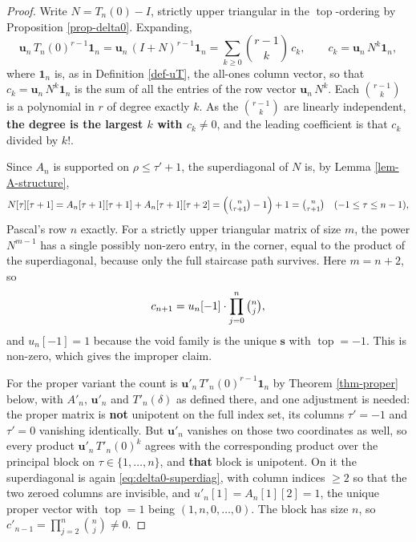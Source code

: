 \documentclass[11pt, a4paper, abstract=yes]{scrartcl}
\theoremstyle{definition}
\theoremstyle{remark}
\theoremstyle{plain}
\newcommand{\vek}[1]{\boldsymbol{#1}}
\newcommand{\tp}{\operatorname{top}}
\begin{document}
\begin{proof}
Write \(N=T_n(0)-I\), strictly upper triangular in the \(\tp\)-ordering by Proposition
\ref{prop-delta0}. Expanding,
\begin{equation}\label{eq:delta0-expansion}
  \vek u_n\,T_n(0)^{r-1}\vek 1_n=\vek u_n\,(I+N)^{r-1}\vek 1_n
  =\sum_{k\ge0}\binom{r-1}{k}\,c_k,\qquad c_k=\vek u_n\,N^k\vek 1_n ,
\end{equation}
where \(\vek 1_n\) is, as in Definition \ref{def-uT}, the all-ones column vector, so that
\(c_k=\vek u_n\,N^k\vek 1_n\) is the sum of all the entries of the row vector \(\vek u_n\,N^k\). Each
\(\binom{r-1}{k}\) is a polynomial in \(r\) of degree exactly \(k\). As the \(\binom{r-1}{k}\)
are linearly independent, \textbf{the degree is the largest \(k\) with \(c_k\ne0\)}, and the leading
coefficient is that \(c_k\) divided by \(k!\).

Since \(A_n\) is supported on \(\rho\le\tau'+1\), the superdiagonal of \(N\) is, by
Lemma \ref{lem-A-structure},
\begin{equation}\label{eq:delta0-superdiag}
  N[\tau][\tau+1]=A_n[\tau+1][\tau+1]+A_n[\tau+1][\tau+2]
  =\Bigl(\tbinom n{\tau+1}-1\Bigr)+1=\tbinom n{\tau+1}
  \quad(-1\le\tau\le n-1),
\end{equation}
Pascal's row \(n\) exactly. For a strictly upper triangular matrix of size \(m\), the power
\(N^{m-1}\) has a single possibly non-zero entry, in the corner, equal to the product of the
superdiagonal, because only the full staircase path survives. Here \(m=n+2\), so
\begin{equation}\label{eq:delta0-corner}
  c_{n+1}=u_n[-1]\cdot\prod_{j=0}^{n}\tbinom nj ,
\end{equation}
and \(u_n[-1]=1\) because the void family is the unique
\(\vek s\) with \(\tp=-1\). This is non-zero, which gives the improper claim.

For the proper variant the count is \(\vek u'_n\,T'_n(0)^{r-1}\vek 1_n\) by Theorem \ref{thm-proper}
below, with \(A'_n\), \(\vek u'_n\) and \(T'_n(\delta)\) as defined there, and one adjustment is
needed: the proper matrix is \textbf{not} unipotent on the full index set, its columns \(\tau'=-1\) and \(\tau'=0\) vanishing identically. But \(\vek u'_n\) vanishes on
those two coordinates as well, so every product \(\vek u'_n\,T'_n(0)^k\) agrees with the corresponding
product over the principal block on \(\tau\in\lbrace1,\dots,n\rbrace\), and \textbf{that} block is
unipotent. On it the superdiagonal is again \eqref{eq:delta0-superdiag}, with column indices
\(\ge2\) so that the two zeroed columns are invisible, and \(u'_n[1]=A_n[1][2]=1\), the unique proper
vector with \(\tp=1\) being \((1,n,0,\dots,0)\). The block has size \(n\), so
\(c'_{n-1}=\prod_{j=2}^{n}\binom nj\ne0\).
\end{proof}
\end{document}
